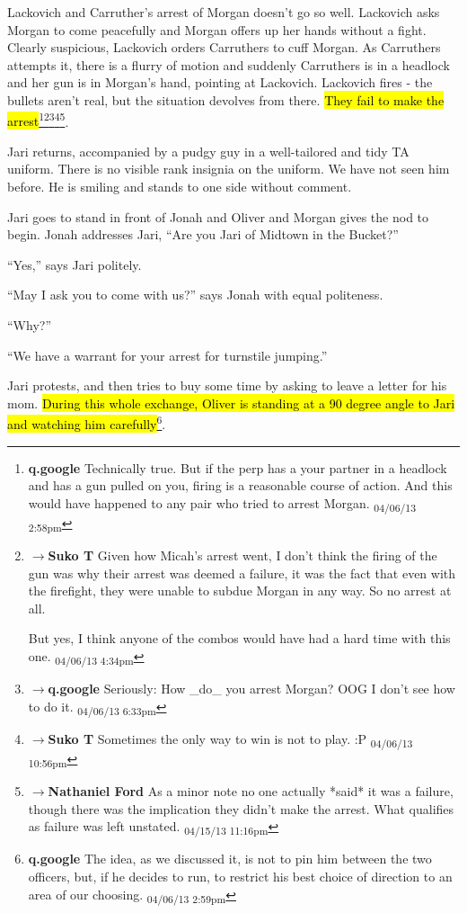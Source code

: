 Lackovich and Carruther's arrest of Morgan doesn't go so well.  Lackovich asks Morgan to come peacefully and Morgan offers up her hands without a fight.  Clearly suspicious, Lackovich orders Carruthers to cuff Morgan.  As Carruthers attempts it, there is a flurry of motion and suddenly Carruthers is in a headlock and her gun is in Morgan's hand, pointing at Lackovich.  Lackovich fires - the bullets aren't real, but the situation devolves from there.  \hl{They fail to make the arrest}\footnote{\textbf{q.google }Technically true.  But if the perp has a your partner in a headlock and has a gun pulled on you, firing is a reasonable course of action.  And this would have happened to any pair who tried to arrest Morgan. \textsubscript{04/06/13 2:58pm}}\footnote{$\rightarrow$\textbf{Suko T }Given how Micah's arrest went, I don't think the firing of the gun was why their arrest was deemed a failure, it was the fact that even with the firefight, they were unable to subdue Morgan in any way.  So no arrest at all.  

But yes, I think anyone of the combos would have had a hard time with this one. \textsubscript{04/06/13 4:34pm}}\footnote{$\rightarrow$\textbf{q.google }Seriously: How \_do\_ you arrest Morgan?  OOG I don't see how to do it. \textsubscript{04/06/13 6:33pm}}\footnote{$\rightarrow$\textbf{Suko T }Sometimes the only way to win is not to play. :P \textsubscript{04/06/13 10:56pm}}\footnote{$\rightarrow$\textbf{Nathaniel Ford }As a minor note no one actually *said* it was a failure, though there was the implication they didn't make the arrest. What qualifies as failure was left unstated. \textsubscript{04/15/13 11:16pm}}.



Jari returns, accompanied by a pudgy guy in a well-tailored and tidy TA uniform.  There is no visible rank insignia on the uniform. We have not seen him before.  He is smiling and stands to one side without comment.



Jari goes to stand in front of Jonah and Oliver and Morgan gives the nod to begin.  Jonah addresses Jari, ``Are you Jari of Midtown in the Bucket?''

``Yes,'' says Jari politely.

``May I ask you to come with us?'' says Jonah with equal politeness.

``Why?''

``We have a warrant for your arrest for turnstile jumping.''

Jari protests, and then tries to buy some time by asking to leave a letter for his mom.  \hl{During this whole exchange, Oliver is standing at a 90 degree angle to Jari and watching him carefully}\footnote{\textbf{q.google }The idea, as we discussed it, is not to pin him between the two officers, but, if he decides to run, to restrict his best choice of direction to an area of our choosing. \textsubscript{04/06/13 2:59pm}}.

